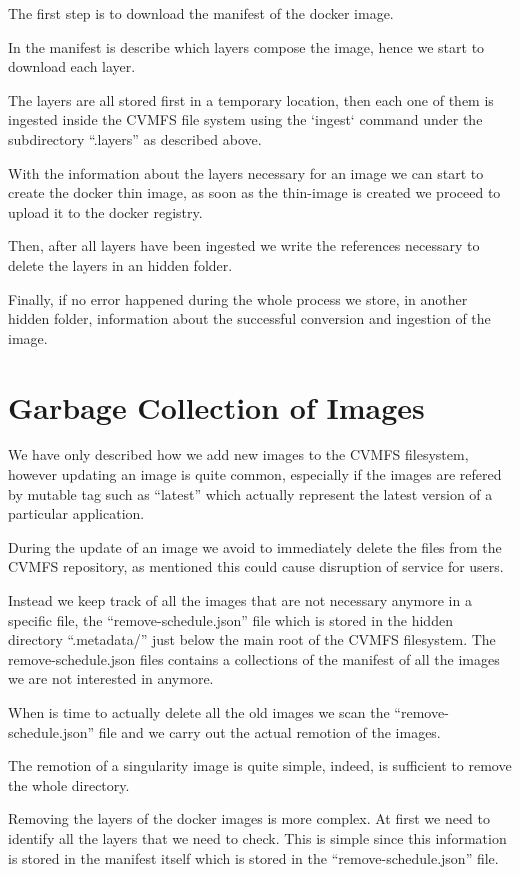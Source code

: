 The first step is to download the manifest of the docker image.

In the manifest is describe which layers compose the image, hence we start to download each layer.

The layers are all stored first in a temporary location, then each one of them is ingested inside the CVMFS file system using the `ingest` command under the subdirectory “.layers” as described above.

With the information about the layers necessary for an image we can start to create the docker thin image, as soon as the thin-image is created we proceed to upload it to the docker registry.

Then, after all layers have been ingested we write the references necessary to delete the layers in an hidden folder.

Finally, if no error happened during the whole process we store, in another hidden folder, information about the successful conversion and ingestion of the image.

\section{Garbage Collection of Images}

We have only described how we add new images to the CVMFS filesystem, however updating an image is quite common, especially if the images are refered by mutable tag such as “latest” which actually represent the latest version of a particular application.

During the update of an image we avoid to immediately delete the files from the CVMFS repository, as mentioned this could cause disruption of service for users.

Instead we keep track of all the images that are not necessary anymore in a specific file, the “remove-schedule.json” file which is stored in the hidden directory “.metadata/” just below the main root of the CVMFS filesystem. The remove-schedule.json files contains a collections of the manifest of all the images we are not interested in anymore.

When is time to actually delete all the old images we scan the “remove-schedule.json” file and we carry out the actual remotion of the images. 

The remotion of a singularity image is quite simple, indeed, is sufficient to remove the whole directory.

Removing the layers of the docker images is more complex. At first we need to identify all the layers that we need to check. This is simple since this information is stored in the manifest itself which is stored in the “remove-schedule.json” file.

